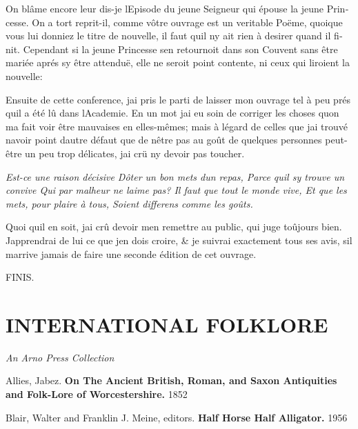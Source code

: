 \documentclass[14pt,a4paper]{memoir}
\begin{document}
\begin{otherlanguage}{french}
On blâme encore leur dis-je l\textquotesingle Episode du jeune Seigneur
qui épouse la jeune Princesse. On a tort reprit-il, comme vôtre ouvrage
est un veritable Poëme, quoique vous lui donniez le titre de nouvelle,
il faut qu\textquotesingle il n\textquotesingle y ait rien à desirer
quand il finit. Cependant si la jeune Princesse s\textquotesingle en
retournoit dans son Couvent sans être mariée aprés s\textquotesingle y
être attenduë, elle ne seroit point contente, ni ceux qui liroient la
nouvelle:

Ensuite de cette conference, j\textquotesingle ai pris le parti de
laisser mon ouvrage tel à peu prés qu\textquotesingle il a été lû dans
l\textquotesingle Academie. En un mot j\textquotesingle ai eu soin de
corriger les choses qu\textquotesingle on m\textquotesingle a fait voir
être mauvaises en elles-mêmes; mais à l\textquotesingle égard de celles
que j\textquotesingle ai trouvé n\textquotesingle avoir point
d\textquotesingle autre défaut que de n\textquotesingle être pas au goût
de quelques personnes peut-être un peu trop délicates,
j\textquotesingle ai crü n\textquotesingle y devoir pas toucher.

\emph{{Est-ce une raison décisive} {D\textquotesingle ôter un bon mets
d\textquotesingle un repas,} {Parce qu\textquotesingle il
s\textquotesingle y trouve un convive} {Qui par malheur ne
l\textquotesingle aime pas?} {Il faut que tout le monde vive,} {Et que
les mets, pour plaire à tous,} {Soient differens comme les goûts.}}

Quoi qu\textquotesingle il en soit, j\textquotesingle ai crû devoir
m\textquotesingle en remettre au public, qui juge toûjours bien.
J\textquotesingle apprendrai de lui ce que j\textquotesingle en dois
croire, \& je suivrai exactement tous ses avis, s\textquotesingle il
m\textquotesingle arrive jamais de faire une seconde édition de cet
ouvrage.

FINIS.

\end{otherlanguage}

\chapter{INTERNATIONAL
FOLKLORE}

\emph{An Arno Press Collection}

Allies, Jabez. \textbf{On The Ancient British, Roman, and Saxon
Antiquities and Folk-Lore of Worcestershire.} 1852

Blair, Walter and Franklin J. Meine, editors. \textbf{Half Horse Half
Alligator.} 1956
\end{document}

